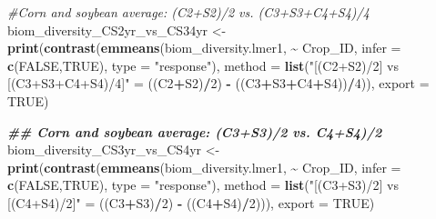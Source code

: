 \documentclass[
]{article}
\newenvironment{Shaded}{\begin{snugshade}}{\end{snugshade}}
\newcommand{\AttributeTok}[1]{\textcolor[rgb]{0.13,0.29,0.53}{#1}}
\newcommand{\CommentTok}[1]{\textcolor[rgb]{0.56,0.35,0.01}{\textit{#1}}}
\newcommand{\ConstantTok}[1]{\textcolor[rgb]{0.56,0.35,0.01}{#1}}
\newcommand{\DecValTok}[1]{\textcolor[rgb]{0.00,0.00,0.81}{#1}}
\newcommand{\DocumentationTok}[1]{\textcolor[rgb]{0.56,0.35,0.01}{\textbf{\textit{#1}}}}
\newcommand{\FunctionTok}[1]{\textcolor[rgb]{0.13,0.29,0.53}{\textbf{#1}}}
\newcommand{\NormalTok}[1]{#1}
\newcommand{\OtherTok}[1]{\textcolor[rgb]{0.56,0.35,0.01}{#1}}
\newcommand{\SpecialCharTok}[1]{\textcolor[rgb]{0.81,0.36,0.00}{\textbf{#1}}}
\newcommand{\StringTok}[1]{\textcolor[rgb]{0.31,0.60,0.02}{#1}}
\begin{document}
\begin{Shaded}
\begin{Highlighting}[]
\CommentTok{\#Corn and soybean average: (C2+S2)/2 vs. (C3+S3+C4+S4)/4}
\NormalTok{biom\_diversity\_CS2yr\_vs\_CS34yr }\OtherTok{\textless{}{-}} \FunctionTok{print}\NormalTok{(}\FunctionTok{contrast}\NormalTok{(}\FunctionTok{emmeans}\NormalTok{(biom\_diversity.lmer1, }\SpecialCharTok{\textasciitilde{}}\NormalTok{ Crop\_ID,}
                                                         \AttributeTok{infer =} \FunctionTok{c}\NormalTok{(}\ConstantTok{FALSE}\NormalTok{,}\ConstantTok{TRUE}\NormalTok{), }
                                                         \AttributeTok{type =} \StringTok{"response"}\NormalTok{),}
                                                 \AttributeTok{method =} \FunctionTok{list}\NormalTok{(}\StringTok{"[(C2+S2)/2] vs [(C3+S3+C4+S4)/4]"} \OtherTok{=} 
\NormalTok{                                                                 ((C2}\SpecialCharTok{+}\NormalTok{S2)}\SpecialCharTok{/}\DecValTok{2}\NormalTok{) }\SpecialCharTok{{-}}\NormalTok{ ((C3}\SpecialCharTok{+}\NormalTok{S3}\SpecialCharTok{+}\NormalTok{C4}\SpecialCharTok{+}\NormalTok{S4))}\SpecialCharTok{/}\DecValTok{4}\NormalTok{)),}
                                        \AttributeTok{export =} \ConstantTok{TRUE}\NormalTok{)}

\DocumentationTok{\#\# Corn and soybean average: (C3+S3)/2 vs. C4+S4)/2}
\NormalTok{biom\_diversity\_CS3yr\_vs\_CS4yr }\OtherTok{\textless{}{-}} \FunctionTok{print}\NormalTok{(}\FunctionTok{contrast}\NormalTok{(}\FunctionTok{emmeans}\NormalTok{(biom\_diversity.lmer1, }\SpecialCharTok{\textasciitilde{}}\NormalTok{ Crop\_ID,}
                                                        \AttributeTok{infer =} \FunctionTok{c}\NormalTok{(}\ConstantTok{FALSE}\NormalTok{,}\ConstantTok{TRUE}\NormalTok{), }
                                                        \AttributeTok{type =} \StringTok{"response"}\NormalTok{), }
                                                \AttributeTok{method =} \FunctionTok{list}\NormalTok{(}\StringTok{"[(C3+S3)/2] vs [(C4+S4)/2]"} \OtherTok{=} 
\NormalTok{                                                                ((C3}\SpecialCharTok{+}\NormalTok{S3)}\SpecialCharTok{/}\DecValTok{2}\NormalTok{) }\SpecialCharTok{{-}}\NormalTok{ ((C4}\SpecialCharTok{+}\NormalTok{S4)}\SpecialCharTok{/}\DecValTok{2}\NormalTok{))),}
                                       \AttributeTok{export =} \ConstantTok{TRUE}\NormalTok{)}



\end{Highlighting}
\end{Shaded}
\end{document}
